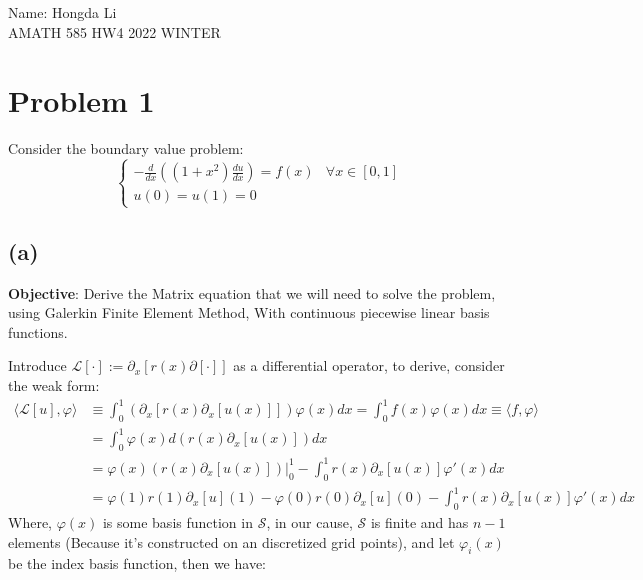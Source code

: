 \documentclass[]{article}
\begin{document}
\begin{center}
    Name: Hongda Li
    \\
    AMATH 585 HW4 2022 WINTER
\end{center}
\section*{Problem 1}
    Consider the boundary value problem: 
    $$
        \begin{cases}
            -\frac{d}{dx}\left(
                (1 + x^2)\frac{du}{dx}
            \right) = f(x) & \forall x \in [0, 1] 
            \\
            u(0) = u(1) = 0 & 
        \end{cases}
    $$
    \subsection*{(a)}
        \hspace{1.1em}
        \textbf{Objective}: Derive the Matrix equation that we will need to solve the problem, using Galerkin Finite Element Method, With continuous piecewise linear basis functions. 
        \par
        Introduce $\mathcal{L}[\cdot]:= \partial_x[r(x)\partial[\cdot]]$ as a differential operator, to derive, consider the weak form: 
        \begin{align*}\tag{1.a.1}\label{eqn:1.a.1}
            \langle \mathcal{L}[u], \varphi\rangle 
            &\equiv 
            \int_{0}^1
            (\partial_x[r(x)\partial_x[u(x)]])\varphi(x)dx 
            = 
            \int_{0}^{1} f(x)\varphi(x)dx \equiv \langle f,\varphi\rangle
            \\
            &= 
            \int_{0}^{1} 
                \varphi(x)d(r(x)\partial_x[u(x)])
            dx
            \\
            &= 
            \left.\varphi(x)(r(x)\partial_x[u(x)])\right|_0^1
            -
            \int_{0}^{1} 
                r(x)\partial_x[u(x)]\varphi'(x)
            dx
            \\
            &= 
            \varphi(1)r(1)\partial_x[u](1) - \varphi(0)r(0)\partial_x[u](0) - 
            \int_{0}^{1} 
                r(x)\partial_x[u(x)]\varphi'(x)
            dx
        \end{align*}
        Where, $\varphi(x)$ is some basis function in $\mathcal{S}$, in our cause, $\mathcal{S}$ is finite and has $n - 1$ elements (Because it's constructed on an discretized grid points), and let $\varphi_i(x)$ be the index basis function, then we have: 
\end{document}
